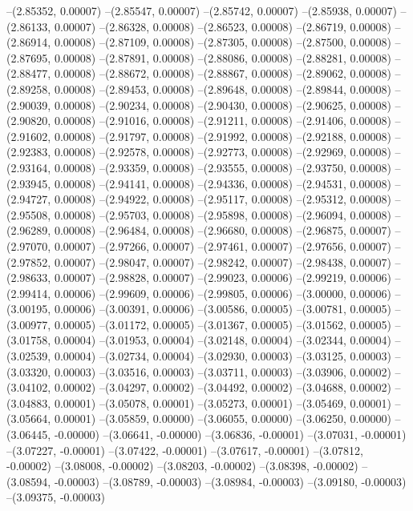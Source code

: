 --(2.85352, 0.00007)
--(2.85547, 0.00007)
--(2.85742, 0.00007)
--(2.85938, 0.00007)
--(2.86133, 0.00007)
--(2.86328, 0.00008)
--(2.86523, 0.00008)
--(2.86719, 0.00008)
--(2.86914, 0.00008)
--(2.87109, 0.00008)
--(2.87305, 0.00008)
--(2.87500, 0.00008)
--(2.87695, 0.00008)
--(2.87891, 0.00008)
--(2.88086, 0.00008)
--(2.88281, 0.00008)
--(2.88477, 0.00008)
--(2.88672, 0.00008)
--(2.88867, 0.00008)
--(2.89062, 0.00008)
--(2.89258, 0.00008)
--(2.89453, 0.00008)
--(2.89648, 0.00008)
--(2.89844, 0.00008)
--(2.90039, 0.00008)
--(2.90234, 0.00008)
--(2.90430, 0.00008)
--(2.90625, 0.00008)
--(2.90820, 0.00008)
--(2.91016, 0.00008)
--(2.91211, 0.00008)
--(2.91406, 0.00008)
--(2.91602, 0.00008)
--(2.91797, 0.00008)
--(2.91992, 0.00008)
--(2.92188, 0.00008)
--(2.92383, 0.00008)
--(2.92578, 0.00008)
--(2.92773, 0.00008)
--(2.92969, 0.00008)
--(2.93164, 0.00008)
--(2.93359, 0.00008)
--(2.93555, 0.00008)
--(2.93750, 0.00008)
--(2.93945, 0.00008)
--(2.94141, 0.00008)
--(2.94336, 0.00008)
--(2.94531, 0.00008)
--(2.94727, 0.00008)
--(2.94922, 0.00008)
--(2.95117, 0.00008)
--(2.95312, 0.00008)
--(2.95508, 0.00008)
--(2.95703, 0.00008)
--(2.95898, 0.00008)
--(2.96094, 0.00008)
--(2.96289, 0.00008)
--(2.96484, 0.00008)
--(2.96680, 0.00008)
--(2.96875, 0.00007)
--(2.97070, 0.00007)
--(2.97266, 0.00007)
--(2.97461, 0.00007)
--(2.97656, 0.00007)
--(2.97852, 0.00007)
--(2.98047, 0.00007)
--(2.98242, 0.00007)
--(2.98438, 0.00007)
--(2.98633, 0.00007)
--(2.98828, 0.00007)
--(2.99023, 0.00006)
--(2.99219, 0.00006)
--(2.99414, 0.00006)
--(2.99609, 0.00006)
--(2.99805, 0.00006)
--(3.00000, 0.00006)
--(3.00195, 0.00006)
--(3.00391, 0.00006)
--(3.00586, 0.00005)
--(3.00781, 0.00005)
--(3.00977, 0.00005)
--(3.01172, 0.00005)
--(3.01367, 0.00005)
--(3.01562, 0.00005)
--(3.01758, 0.00004)
--(3.01953, 0.00004)
--(3.02148, 0.00004)
--(3.02344, 0.00004)
--(3.02539, 0.00004)
--(3.02734, 0.00004)
--(3.02930, 0.00003)
--(3.03125, 0.00003)
--(3.03320, 0.00003)
--(3.03516, 0.00003)
--(3.03711, 0.00003)
--(3.03906, 0.00002)
--(3.04102, 0.00002)
--(3.04297, 0.00002)
--(3.04492, 0.00002)
--(3.04688, 0.00002)
--(3.04883, 0.00001)
--(3.05078, 0.00001)
--(3.05273, 0.00001)
--(3.05469, 0.00001)
--(3.05664, 0.00001)
--(3.05859, 0.00000)
--(3.06055, 0.00000)
--(3.06250, 0.00000)
--(3.06445, -0.00000)
--(3.06641, -0.00000)
--(3.06836, -0.00001)
--(3.07031, -0.00001)
--(3.07227, -0.00001)
--(3.07422, -0.00001)
--(3.07617, -0.00001)
--(3.07812, -0.00002)
--(3.08008, -0.00002)
--(3.08203, -0.00002)
--(3.08398, -0.00002)
--(3.08594, -0.00003)
--(3.08789, -0.00003)
--(3.08984, -0.00003)
--(3.09180, -0.00003)
--(3.09375, -0.00003)
